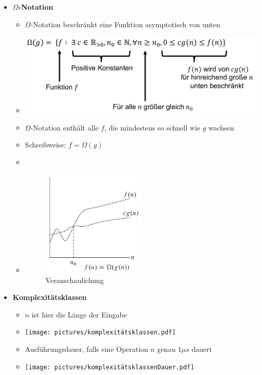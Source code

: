 \documentclass[
    12pt,
    a4paper,
    ngerman,
    color=3b,%
    marginpar=false,
    colorback=false,
    leqno,
]{tudaexercise}
\begin{document}
\begin{itemize}
    \item \textbf{$\Omega$-Notation}
          \begin{itemize}
              \item $\Omega$-Notation beschränkt eine Funktion asymptotisch von unten
              \item[] \includegraphics[width=12cm]{pictures/omegaNotation.pdf}
              \item $\Omega$-Notation enthält alle $f$, die mindestens so schnell wie $g$ wachsen
              \item Schreibweise: $f = \Omega(g)$
              \item[]
              \item[]
                    \begin{minipage}{0.3\textwidth}
                        \begin{figure}[H]
                            \centering
                            \includegraphics[width=5cm]{pictures/omegaNotationGraph.pdf}
                            \caption{Veranschaulichung}
                            \label{}
                        \end{figure}
                    \end{minipage}
                    \begin{minipage}[t]{0.6\textwidth}
                        \vspace{-3cm}
                    \end{minipage}
          \end{itemize}
          \clearpage
    \item \textbf{Komplexitätsklassen}
          \begin{itemize}
              \item $n$ ist hier die Länge der Eingabe
              \item[] \texttt{[image: pictures/komplexitätsklassen.pdf]}
              \item Ausführungsdauer, falls eine Operation $n$ genau $1\mu s$ dauert
              \item[] \texttt{[image: pictures/komplexitätsklassenDauer.pdf]}
          \end{itemize}


\end{itemize}
\end{document}
